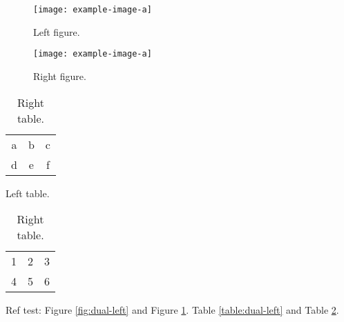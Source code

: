 \documentclass{article}
\begin{document}
\begin{figure}
  \centering
  \begin{minipage}{.5\textwidth}
    \centering
   \texttt{[image: example-image-a]}
   \caption{Left figure.}
   \label{fig:dual-left}
  \end{minipage}%
  \begin{minipage}{.5\textwidth}
    \centering
   \texttt{[image: example-image-a]}
   \caption{Right figure.}
   \label{fig:dual-right}
  \end{minipage}
  \end{figure}
\begin{table}
  \centering
  \begin{minipage}{.5\textwidth}
    \centering
   \begin{tabular}{ccc}
   a & b & c \\
   d & e & f \\
   \end{tabular}
   \caption{Left table.}
   \label{table:dual-left}
  \end{minipage}%
  \begin{minipage}{.5\textwidth}
    \centering
    \begin{tabular}{ccc}
      1 & 2 & 3 \\
      4 & 5 & 6 \\
      \end{tabular}
   \caption{Right table.}
   \label{table:dual-right}
  \end{minipage}
\end{table}

Ref test:
Figure \ref{fig:dual-left} and Figure \ref{fig:dual-right}.
Table \ref{table:dual-left} and Table \ref{table:dual-right}.
\end{document}
